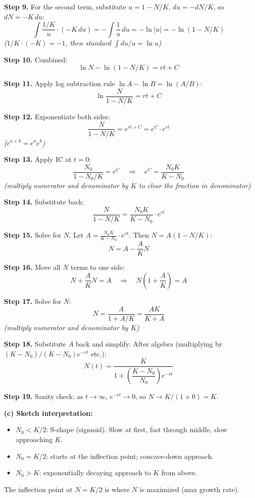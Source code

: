 \documentclass[10pt]{article}
\newcommand{\thus}{\quad\Longrightarrow\quad}
\newcommand{\stepwhy}[1]{\textcolor{blue!60!black}{\small\textit{(#1)}}}
\begin{document}
\begin{solution}
\textbf{Step 9.} For the second term, substitute $u = 1 - N/K$, $du = -dN/K$, so $dN = -K\,du$:
\[
\int\frac{1/K}{u}\cdot(-K\,du) = -\int\frac{1}{u}\,du = -\ln|u| = -\ln(1-N/K)
\]
\stepwhy{$1/K \cdot (-K) = -1$, then standard $\int du/u = \ln u$}

\textbf{Step 10.} Combined:
\[
\ln N - \ln(1-N/K) = rt + C
\]

\textbf{Step 11.} Apply log subtraction rule $\ln A - \ln B = \ln(A/B)$:
\[
\ln\frac{N}{1-N/K} = rt + C
\]

\textbf{Step 12.} Exponentiate both sides:
\[
\frac{N}{1-N/K} = e^{rt+C} = e^C\cdot e^{rt}
\]
\stepwhy{$e^{a+b} = e^a e^b$}

\textbf{Step 13.} Apply IC at $t=0$:
\[
\frac{N_0}{1-N_0/K} = e^C \thus e^C = \frac{N_0 K}{K - N_0}
\]
\stepwhy{multiply numerator and denominator by $K$ to clear the fraction in denominator}

\textbf{Step 14.} Substitute back:
\[
\frac{N}{1-N/K} = \frac{N_0 K}{K-N_0}\cdot e^{rt}
\]

\textbf{Step 15.} Solve for $N$. Let $A = \frac{N_0 K}{K-N_0}\cdot e^{rt}$. Then $N = A(1-N/K)$:
\[
N = A - \frac{A}{K}N
\]

\textbf{Step 16.} Move all $N$ terms to one side:
\[
N + \frac{A}{K}N = A \thus N\left(1 + \frac{A}{K}\right) = A
\]

\textbf{Step 17.} Solve for $N$:
\[
N = \frac{A}{1 + A/K} = \frac{A K}{K + A}
\]
\stepwhy{multiply numerator and denominator by $K$}

\textbf{Step 18.} Substitute $A$ back and simplify. After algebra (multiplying by $(K-N_0)/(K-N_0) e^{-rt}$ etc.):
\[
\boxed{N(t) = \frac{K}{1 + \left(\dfrac{K-N_0}{N_0}\right)e^{-rt}}}
\]

\textbf{Step 19.} Sanity check: as $t\to\infty$, $e^{-rt}\to 0$, so $N \to K/(1+0) = K$. \checkmark

\medskip\textbf{(c) Sketch interpretation:}
\begin{itemize}
\item $N_0 < K/2$: S-shape (sigmoid). Slow at first, fast through middle, slow approaching $K$.
\item $N_0 = K/2$: starts at the inflection point; concave-down approach.
\item $N_0 > K$: exponentially decaying approach to $K$ from above.
\end{itemize}

The inflection point at $N = K/2$ is where $\dot N$ is maximized (max growth rate).
\end{solution}
\end{document}
